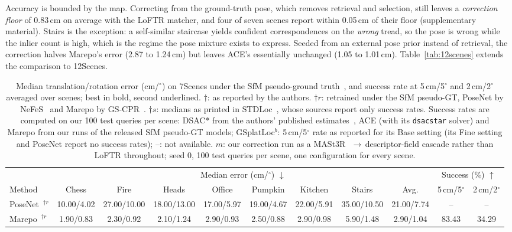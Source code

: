 \documentclass[journal]{IEEEtran}
\begin{document}
Accuracy is bounded by the map. Correcting from the ground-truth pose, which removes retrieval and selection, still leaves a \emph{correction floor} of 0.83\,cm on average with the LoFTR matcher, and four of seven scenes report within 0.05\,cm of their floor (supplementary material). Stairs is the exception: a self-similar staircase yields confident correspondences on the \emph{wrong} tread, so the pose is wrong while the inlier count is high, which is the regime the pose mixture exists to express. Seeded from an external pose prior instead of retrieval, the correction halves Marepo's error (2.87 to 1.24\,cm) but leaves ACE's essentially unchanged (1.05 to 1.01\,cm). Table~\ref{tab:12scenes} extends the comparison to 12Scenes.

\begin{table}[t]
\centering
\caption{Median translation/rotation error (cm/$^\circ$) on 7Scenes under the SfM pseudo-ground truth~\cite{brachmann2021dslam}, and success rate at 5\,cm/5$^\circ$ and 2\,cm/2$^\circ$ averaged over scenes; best in bold, second underlined. $\dagger$: as reported by the authors. $\dagger r$: retrained under the SfM pseudo-GT, PoseNet by NeFeS~\cite{nefes} and Marepo by GS-CPR~\cite{gscpr}. $\dagger s$: medians as printed in STDLoc~\cite{stdloc}, whose sources report only success rates. Success rates are computed on our 100 test queries per scene: DSAC* from the authors' published estimates~\cite{brachmann2021dslam}, ACE (with its \texttt{dsacstar} solver) and Marepo from our runs of the released SfM pseudo-GT models; GSplatLoc$^{b}$: 5\,cm/5$^\circ$ rate as reported for its Base setting (its Fine setting and PoseNet report no success rates); --: not available. $m$: our correction run as a MASt3R~\cite{mast3r}$\,\to\,$descriptor-field cascade rather than LoFTR throughout; seed 0, 100 test queries per scene, one configuration for every scene.}
\label{tab:7scenes}
\setlength{\tabcolsep}{2.2pt}
\footnotesize
\begin{tabular}{lcccccccc cc}
\toprule
& \multicolumn{8}{c}{Median error (cm/$^\circ$) $\downarrow$} & \multicolumn{2}{c}{Success (\%) $\uparrow$}\\
\cmidrule(lr){2-9}\cmidrule(lr){10-11}
Method & Chess & Fire & Heads & Office & Pumpkin & Kitchen & Stairs & Avg. & 5\,cm/5$^\circ$ & 2\,cm/2$^\circ$\\
\midrule
PoseNet~\cite{posenet}$^{\dagger r}$ & 10.00/4.02 & 27.00/10.00 & 18.00/13.00 & 17.00/5.97 & 19.00/4.67 & 22.00/5.91 & 35.00/10.50 & 21.00/7.74 & -- & --\\
Marepo~\cite{marepo}$^{\dagger r}$ & 1.90/0.83 & 2.30/0.92 & 2.10/1.24 & 2.90/0.93 & 2.50/0.88 & 2.90/0.98 & 5.90/1.48 & 2.90/1.04 & 83.43 & 34.29\\

\end{tabular}
\end{table}
\end{document}
